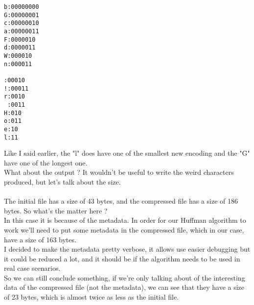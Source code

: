\begin{verbatim}
b:00000000
G:00000001
c:00000010
a:00000011
F:0000010
d:0000011
W:000010
n:000011

:00010
!:00011
r:0010
 :0011
H:010
o:011
e:10
l:11
\end{verbatim}
Like I said earlier, the "l" does have one of the smallest new encoding and the "G" have one of the longest one.\\
What about the output ? It wouldn't be useful to write the weird characters produced, but let's talk about the size.\\
\\
The initial file has a size of 43 bytes, and the compressed file has a size of 186 bytes. So what's the matter here ?\\
In this case it is because of the metadata. In order for our Huffman algorithm to work we'll need to put some metadata in the compressed file, which in our case, have a size of 163 bytes.\\
I decided to make the metadata pretty verbose, it allows use easier debugging but it could be reduced a lot, and it should be if the algorithm needs to be used in real case scenarios.\\
So we can still conclude something, if we're only talking about of the interesting data of the compressed file (not the metadata), we can see that they have a size of 23 bytes, which is almost twice as less as the initial file.